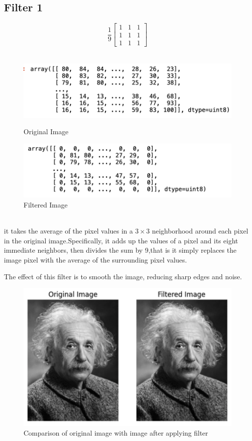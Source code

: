 \documentclass{assignment}
\begin{document}
\subsection{Filter 1}
\[
\frac{1}{9}\begin{bmatrix} 1 & 1 & 1 \\ 1 & 1 & 1 \\ 1 & 1 & 1 \end{bmatrix}
\]
\\
\begin{figure}[h]
  \begin{minipage}{0.5\textwidth}
    \centering
    \includegraphics[width=0.8\linewidth]{image.png}
    \caption{Original Image}
    \label{fig:original_image}
  \end{minipage}%
  \begin{minipage}{0.5\textwidth}
    \centering
    \includegraphics[width=0.8\linewidth]{f3_1.png}
    \caption{Filtered Image}
    \label{fig:filtered_image}
  \end{minipage}
\end{figure}
\\
it takes the average of the pixel values in a \(3 \times 3\) neighborhood around each pixel in the original image.Specifically, it adds up the values of a pixel and its eight immediate neighbors, then divides the sum by 9,that is it simply replaces the image pixel with the average of the surrounding pixel values.

The effect of this filter is to smooth the image, reducing sharp edges and noise.
\\
\begin{figure}[h]
    \centering
    \includegraphics[width=0.4\linewidth]{magic.png}
    \caption{Comparison of original image with image after applying filter}
    \label{fig:enter-label}
\end{figure}
\\
\end{document}
